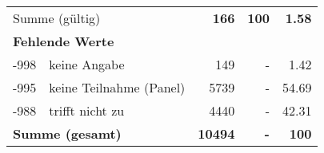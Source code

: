 \begin{longtable}{lXrrr}
     \midrule
     \multicolumn{2}{l}{Summe (gültig)} &
       \textbf{\num{166}} &
     \textbf{100} &
       \textbf{\num[round-mode=places,round-precision=2]{1,58}} \\
     \multicolumn{5}{l}{\textbf{Fehlende Werte}}\\
       -998 &
       keine Angabe &
         \num{149} &
        - &
         \num[round-mode=places,round-precision=2]{1,42} \\
       -995 &
       keine Teilnahme (Panel) &
         \num{5739} &
        - &
         \num[round-mode=places,round-precision=2]{54,69} \\
       -988 &
       trifft nicht zu &
         \num{4440} &
        - &
         \num[round-mode=places,round-precision=2]{42,31} \\
     \midrule
     \multicolumn{2}{l}{\textbf{Summe (gesamt)}} &
          \textbf{\num{10494}} &
        \textbf{-} &
        \textbf{100} \\
     \bottomrule
     \end{longtable}
     
